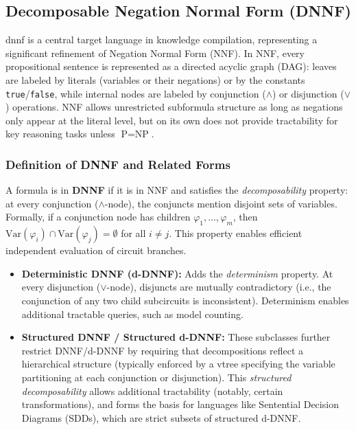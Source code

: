 \subsection{Decomposable Negation Normal Form (DNNF)}

\acrfull{dnnf} is a central target language in knowledge compilation, representing a significant refinement of Negation Normal Form (NNF). In NNF, every propositional sentence is represented as a directed acyclic graph (DAG): leaves are labeled by literals (variables or their negations) or by the constants \texttt{true}/\texttt{false}, while internal nodes are labeled by conjunction ($\wedge$) or disjunction ($\vee$) operations. NNF allows unrestricted subformula structure as long as negations only appear at the literal level, but on its own does not provide tractability for key reasoning tasks unless $\text{P} = \text{NP}$.

\subsubsection{Definition of DNNF and Related Forms}
A formula is in \textbf{DNNF} if it is in NNF and satisfies the \emph{decomposability} property: at every conjunction ($\wedge$-node), the conjuncts mention disjoint sets of variables. Formally, if a conjunction node has children $\varphi_1, \ldots, \varphi_m$, then $\mathrm{Var}(\varphi_i) \cap \mathrm{Var}(\varphi_j) = \emptyset$ for all $i \neq j$. This property enables efficient independent evaluation of circuit branches.

\begin{itemize}
    \item \textbf{Deterministic DNNF (d-DNNF):} Adds the \emph{determinism} property. At every disjunction ($\vee$-node), disjuncts are mutually contradictory (i.e., the conjunction of any two child subcircuits is inconsistent). Determinism enables additional tractable queries, such as model counting.
    \item \textbf{Structured DNNF / Structured d-DNNF:} These subclasses further restrict DNNF/d-DNNF by requiring that decompositions reflect a hierarchical structure (typically enforced by a vtree specifying the variable partitioning at each conjunction or disjunction). This \emph{structured decomposability} allows additional tractability (notably, certain transformations), and forms the basis for languages like Sentential Decision Diagrams (SDDs), which are strict subsets of structured d-DNNF.
\end{itemize}

